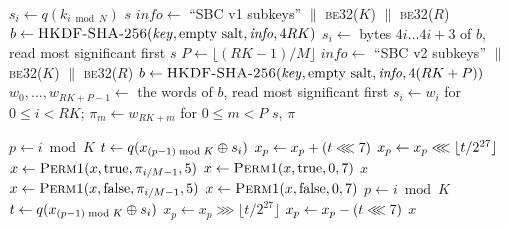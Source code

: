 \begin{algorithm}[htbp]
\caption{Key setup}
\label{alg:keysetup}
\begin{algorithmic}[1]
 
    \State $s_i \gets q(k_{i \bmod N})$ 
  \EndFor
  \State \Return $s$
\EndFunction
{} 
  \State $\mathit{info} \gets$ ``SBC v1 subkeys'' $\|$ \textsc{be32}($K$) $\|$ \textsc{be32}($R$)
  \State $b \gets \textsc{HKDF-SHA-256}(\mathit{key}, \text{empty salt}, \mathit{info}, 4RK)$
    \State $s_i \gets$ bytes $4i \ldots 4i+3$ of $b$, read most significant first
  \EndFor
  \State \Return $s$ 
\EndFunction
{} 
  \State $P \gets \lfloor (RK-1)/M \rfloor$ 
  \State $\mathit{info} \gets$ ``SBC v2 subkeys'' $\|$ \textsc{be32}($K$) $\|$ \textsc{be32}($R$)
  \State $b \gets \textsc{HKDF-SHA-256}(\mathit{key}, \text{empty salt}, \mathit{info}, 4(RK+P))$
  \State $w_0, \ldots, w_{RK+P-1} \gets$ the words of $b$, read most significant first
  \State $s_i \gets w_i$ for $0 \le i < RK$; \quad $\pi_m \gets w_{RK+m}$ for $0 \le m < P$
  \State \Return $s$, $\pi$ 
\EndFunction
\end{algorithmic}
\end{algorithm}

\begin{algorithm}[htbp]
\caption{Encrypting and decrypting one block}
\label{alg:block}
\begin{algorithmic}[1]
    \State $p \gets i \bmod K$
    \State $t \gets q(x_{(p-1) \bmod K} \oplus s_i)$
    \State $x_p \gets x_p + (t \lll 7)$
      \State $x_p \gets x_p \lll \lfloor t/2^{27} \rfloor$ 
    \EndIf
        \State $x \gets \textsc{Perm1}(x, \text{true}, \pi_{i/M - 1}, 5)$
      \Else
        \State $x \gets \textsc{Perm1}(x, \text{true}, 0, 7)$
      \EndIf
    \EndIf
  \EndFor
  \State \Return $x$
\EndFunction
{}
        \State $x \gets \textsc{Perm1}(x, \text{false}, \pi_{i/M - 1}, 5)$
      \Else
        \State $x \gets \textsc{Perm1}(x, \text{false}, 0, 7)$
      \EndIf
    \EndIf
    \State $p \gets i \bmod K$
    \State $t \gets q(x_{(p-1) \bmod K} \oplus s_i)$
      \State $x_p \gets x_p \ggg \lfloor t/2^{27} \rfloor$ 
    \EndIf
    \State $x_p \gets x_p - (t \lll 7)$
  \EndFor
  \State \Return $x$
\EndFunction
\end{algorithmic}
\end{algorithm}

